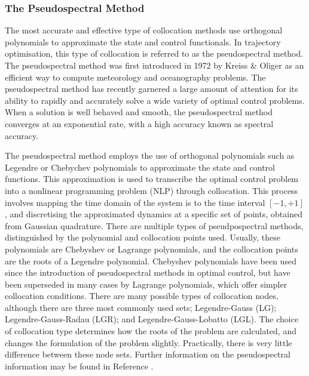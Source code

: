 \subsubsection{The Pseudospectral Method}\label{sec:PS}


The most accurate and effective type of collocation methods use orthogonal polynomials to approximate the state and control functionals\cite{Fahroo2000}. In trajectory optimisation, this type of collocation is referred to as the pseudospectral method\cite{Kelly2015}. 
The pseudospectral method was first introduced in 1972 by Kreiss \& Oliger\cite{Kreiss1972} as an efficient way to compute meteorology and oceanography problems. The pseudospectral method has recently garnered a large amount of attention for its ability to rapidly and accurately solve a wide variety of optimal control problems.  When a solution is well behaved and smooth, the pseudospectral method converges at an exponential rate, with a high accuracy known as spectral accuracy\cite{Ross2004,Darby2011a}. 

The pseudospectral method employs the use of orthogonal polynomials such as Legendre or Chebychev polynomials to approximate the state and control functions.
This approximation is used to transcribe the optimal control problem into a nonlinear programming problem (NLP) through collocation. This process involves mapping the time domain of the system is to the time interval $[-1,+1]$, and discretising the approximated dynamics at a specific set of points, obtained from Gaussian quadrature\cite{Fahroo2000,Huntington2007,Kelly2015,Rao2009,Garg2011}. 
There are multiple types of pseudpospectral methods, distinguished by the polynomial and collocation points used. Usually, these polynomials are Chebyshev or Lagrange polynomials\cite{Fahroo2000,Rao2009}, and the collocation points are the roots of a Legendre polynomial\cite{Garg2009}. Chebyshev polynomials have been used since the introduction of pseudospectral methods in optimal control, but have been superseded in many cases by Lagrange polynomials, which offer simpler collocation conditions\cite{Rao2009}. 
There are many possible types of collocation nodes, although there are three most commonly used sets; Legendre-Gauss (LG); Legendre-Gauss-Radau (LGR); and Legendre-Gauss-Lobatto (LGL)\cite{Garg2009,Rao2009}. The choice of collocation type determines how the roots of the problem are calculated, and changes the formulation of the problem slightly\cite{Garg2009}. Practically, there is very little difference between these node sets\cite{Garg2009}.
Further information on the pseudospectral information may be found in Reference \cite{Huntington2007}.


